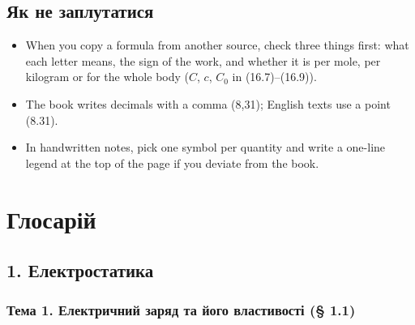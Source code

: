 \documentclass[11pt,a4paper,oneside]{book}
\begin{document}
\section*{Як не заплутатися}
\begin{itemize}
\item When you copy a formula from another source, check three things first: what each letter means, the sign of the work, and whether it is per mole, per kilogram or for the whole body ($C$, $c$, $C_0$ in (16.7)–(16.9)).
\item The book writes decimals with a comma (8,31); English texts use a point (8.31).
\item In handwritten notes, pick one symbol per quantity and write a one-line legend at the top of the page if you deviate from the book.
\end{itemize}

\chapter*{Глосарій}
\section*{1. Електростатика}

\subsection*{Тема 1. Електричний заряд та його властивості (§ 1.1)}
\end{document}
